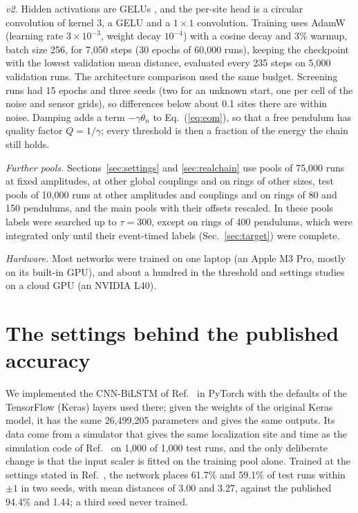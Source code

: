 \documentclass[11pt]{article}
\begin{document}
\textit{v2.} Hidden activations are GELUs \cite{hendrycks2016gelu}, and the per-site head is a circular convolution of kernel 3, a GELU and a $1\times1$ convolution. Training uses AdamW (learning rate $3\times10^{-3}$, weight decay $10^{-4}$) with a cosine decay and 3\% warmup, batch size 256, for 7,050 steps (30 epochs of 60,000 runs), keeping the checkpoint with the lowest validation mean distance, evaluated every 235 steps on 5,000 validation runs. The architecture comparison used the same budget. Screening runs had 15 epochs and three seeds (two for an unknown start, one per cell of the noise and sensor grids), so differences below about 0.1 sites there are within noise. Damping adds a term $-\gamma\dot\theta_n$ to Eq.~(\ref{eq:eom}), so that a free pendulum has quality factor $Q=1/\gamma$; every threshold is then a fraction of the energy the chain still holds.

\textit{Further pools.} Sections~\ref{sec:settings} and \ref{sec:realchain} use pools of 75,000 runs at fixed amplitudes, at other global couplings and on rings of other sizes, test pools of 10,000 runs at other amplitudes and couplings and on rings of 80 and 150 pendulums, and the main pools with their offsets rescaled. In these pools labels were searched up to $\tau=300$, except on rings of 400 pendulums, which were integrated only until their event-timed labels (Sec.~\ref{sec:target}) were complete.

\textit{Hardware.} Most networks were trained on one laptop (an Apple M3 Pro, mostly on its built-in GPU), and about a hundred in the threshold and settings studies on a cloud GPU (an NVIDIA L40).

\section{The settings behind the published accuracy}
\label{sec:repro}

We implemented the CNN-BiLSTM of Ref.~\cite{mittal2026jand} in PyTorch with the defaults of the TensorFlow (Keras) layers used there; given the weights of the original Keras model, it has the same 26,499,205 parameters and gives the same outputs. Its data come from a simulator that gives the same localization site and time as the simulation code of Ref.~\cite{mittal2026jand} on 1,000 of 1,000 test runs, and the only deliberate change is that the input scaler is fitted on the training pool alone. Trained at the settings stated in Ref.~\cite{mittal2026jand}, the network places 61.7\% and 59.1\% of test runs within $\pm1$ in two seeds, with mean distances of 3.00 and 3.27, against the published 94.4\% and 1.44; a third seed never trained.
\end{document}
